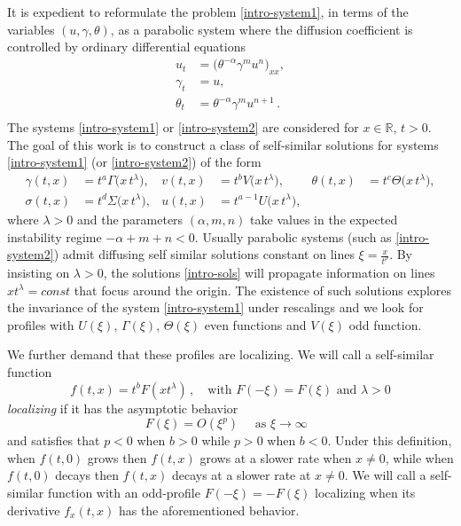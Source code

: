 \documentclass[11pt]{article}
\def\BO{{{O}}}
\def\R{\mathbb{R}}
\newcommand{\tcb}{}
\theoremstyle{remark}
\begin{document}
\tcb{
It is expedient to reformulate the problem \eqref{intro-system1}, in terms of the variables
$(u, \gamma, \theta)$, as a parabolic system where the diffusion coefficient is controlled by ordinary differential equations
\begin{equation}
\label{intro-system2}
\begin{aligned}
u_t &= \big ( \theta^{-\alpha}\gamma^m u^n \big )_{xx} , \\
 \gamma_t &= u ,\\
 \theta_t &= \theta^{-\alpha}\gamma^m u^{n+1}  \, . \\
\end{aligned}
\end{equation}
The systems \eqref{intro-system1} or \eqref{intro-system2} are  considered for $x \in \R$, $t > 0$.
}
The goal of this work is to construct a class of self-similar solutions for systems \eqref{intro-system1} (or \eqref{intro-system2})
of the form
\begin{equation} \label{intro-sols}
\begin{aligned}
 \gamma (t,x) &= t^a\Gamma\big( x \, t^\lambda \big), & v (t,x) &= t^bV\big( x \, t^\lambda \big), & \theta (t,x) &= t^c\Theta\big( x \, t^\lambda \big),\\
 {\sigma}(t,x) &= t^d\Sigma\big( x \, t^\lambda \big), & u(t,x) &= t^{a-1}U\big( x \, t^\lambda \big),
\end{aligned}
\end{equation}
where $\lambda > 0$ and the parameters $(\alpha, m, n)$ take values in the expected instability regime $-\alpha+m+n<0$.
Usually parabolic systems (such as \eqref{intro-system2}) admit diffusing self similar solutions constant on lines $\xi = \frac{x}{t^\rho}$.
By insisting on $\lambda >0$,
the solutions \eqref{intro-sols} will  propagate information on lines $x t^\lambda = const$ that focus around the origin.
The existence of such solutions explores the invariance of the system \eqref{intro-system1} under rescalings and we look for profiles with
$U(\xi)$, $\Gamma(\xi)$, $\Theta(\xi)$ even functions and $V(\xi)$ odd function.


We further demand that these profiles are localizing. We will call a self-similar function
\begin{equation}
\label{deflocal1}
f(t,x) = t^b F(x t^\lambda) \, , \quad \mbox{with $F(-\xi) = F(\xi)$ and $\lambda > 0$}
\end{equation}
{\it localizing} if it has the asymptotic behavior
\begin{equation}
\label{deflocal2}
F(\xi) = \BO (\xi^p)    \quad \mbox{ as $\xi \to \infty$ }
\end{equation}
and satisfies that $p < 0$ when $b > 0$ while $p > 0$ when $b < 0$. Under this definition, when $f(t,0)$ grows then $f(t,x)$ grows at a slower
rate when $x \ne 0$, while when $f(t,0)$ decays then $f(t,x)$ decays at a slower rate at $x \ne 0$. We will call a self-similar function with an odd-profile
$F(-\xi) = -F(\xi)$ localizing when its derivative $f_x( t,x)$ has the aforementioned behavior.
\end{document}
